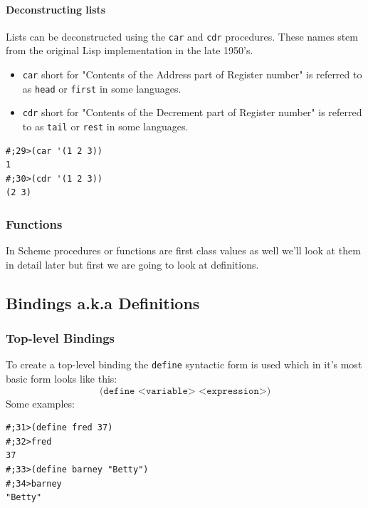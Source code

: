 \documentclass[12pt,a4paper,english,twoside]{article}
\begin{document}
\paragraph{Deconstructing lists}
Lists can be deconstructed using the \texttt{car} and \texttt{cdr} procedures. 
These names stem from the original Lisp implementation in the late 1950's.  
\begin{itemize}
\item \texttt{car} short for "Contents of the Address part of Register number" 
  is referred to as \texttt{head} or \texttt{first} in some languages.
\item \texttt{cdr} short for "Contents of the Decrement part of Register 
  number" is referred to as \texttt{tail} or \texttt{rest} in some languages.
\end{itemize} \begin{lstlisting}
#;29>(car '(1 2 3))
1
#;30>(cdr '(1 2 3))
(2 3)
\end{lstlisting}
\subsubsection{Functions}
In Scheme procedures or functions are first class values as well we'll look at 
them in detail later but first we are going to look at definitions.
\subsection{Bindings a.k.a Definitions}
\subsubsection{Top-level Bindings}
To create a top-level binding the \texttt{define} syntactic form is used which 
in it's most basic form looks like this:
\begin{equation*}
\texttt{(define <variable> <expression>)}
\end{equation*}
Some examples:
\begin{lstlisting}
#;31>(define fred 37)
#;32>fred
37
#;33>(define barney "Betty")
#;34>barney
"Betty"
\end{lstlisting}
\end{document}
